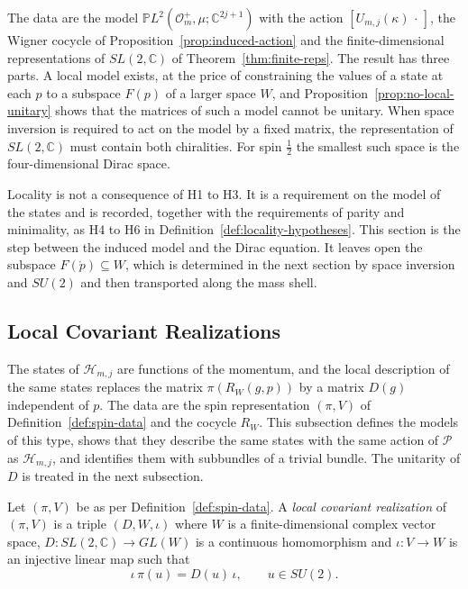 The data are the model $\mathbb{P}L^2(\mathcal{O}_m^+,\mu;\mathbb{C}^{2j+1})$ with the action $[U_{m,j}(\kappa)\,\cdot\,]$, the Wigner cocycle of Proposition~\ref{prop:induced-action} and the finite-dimensional representations of $SL(2,\mathbb{C})$ of Theorem~\ref{thm:finite-reps}. The result has three parts. A local model exists, at the price of constraining the values of a state at each $p$ to a subspace $F(p)$ of a larger space $W$, and Proposition~\ref{prop:no-local-unitary} shows that the matrices of such a model cannot be unitary. When space inversion is required to act on the model by a fixed matrix, the representation of $SL(2,\mathbb{C})$ must contain both chiralities. For spin $\frac12$ the smallest such space is the four-dimensional Dirac space.

Locality is not a consequence of H1 to H3. It is a requirement on the model of the states and is recorded, together with the requirements of parity and minimality, as H4 to H6 in Definition~\ref{def:locality-hypotheses}. This section is the step between the induced model and the Dirac equation. It leaves open the subspace $F(\mathring{p})\subseteq W$, which is determined in the next section by space inversion and $SU(2)$ and then transported along the mass shell.

\subsection{Local Covariant Realizations}
\label{subsec:local-realizations}

The states of $\mathcal{H}_{m,j}$ are functions of the momentum, and the local description of the same states replaces the matrix $\pi(R_W(g,p))$ by a matrix $D(g)$ independent of $p$. The data are the spin representation $(\pi,V)$ of Definition~\ref{def:spin-data} and the cocycle $R_W$. This subsection defines the models of this type, shows that they describe the same states with the same action of $\mathcal{P}$ as $\mathcal{H}_{m,j}$, and identifies them with subbundles of a trivial bundle. The unitarity of $D$ is treated in the next subsection.

\begin{definition}\label{def:local-realization}
	Let $(\pi,V)$ be as per Definition~\ref{def:spin-data}. A \emph{local covariant realization} of $(\pi,V)$ is a triple $(D,W,\iota)$ where $W$ is a finite-dimensional complex vector space, $D:SL(2,\mathbb{C})\to GL(W)$ is a continuous homomorphism and $\iota:V\to W$ is an injective linear map such that
	\begin{equation}\label{eq:iota-intertwiner}
		\iota\,\pi(u)=D(u)\,\iota,\qquad u\in SU(2).
	\end{equation}
\end{definition}

